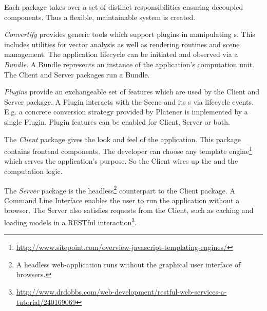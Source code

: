 \documentclass[../ClassicThesis.tex]{subfiles}
\begin{document}
Each package takes over a set of distinct responsibilities ensuring decoupled
components. Thus a flexible, maintainable system is created.

\emph{Convertify} provides generic tools which support plugins in manipulating
{\threedmodel}s. This includes utilities for vector analysis as well as
rendering routines and scene management. The application lifecycle can be
initiated and observed via a \emph{Bundle}. A Bundle represents an instance of
the application's computation unit. The Client and Server packages run a Bundle.

\emph{Plugins} provide an exchangeable set of features which are used by the
Client and Server package. A Plugin interacts with the Scene and its
{\threedmodel}s via lifecycle events. E.g. a concrete conversion strategy
provided by Platener is implemented by a single Plugin. Plugin features can be
enabled for Client, Server or both.

The \emph{Client} package gives the look and feel of the application. This
package contains frontend components. The developer can choose any template
engine\footnote{\url{http://www.sitepoint.com/overview-javascript-templating-engines/}}
which serves the application's purpose. So the Client wires up the
{\userinterface} and the computation logic.

The \emph{Server} package is the headless\footnote{A headless web-application
  runs without the graphical user interface of browsers.} counterpart to the
Client package. A Command Line Interface enables the user to run the application
without a browser. The Server also satisfies requests from the Client, such as
caching and loading models in a RESTful
interaction\footnote{\url{http://www.drdobbs.com/web-development/restful-web-services-a-tutorial/240169069}}.

\end{document}
